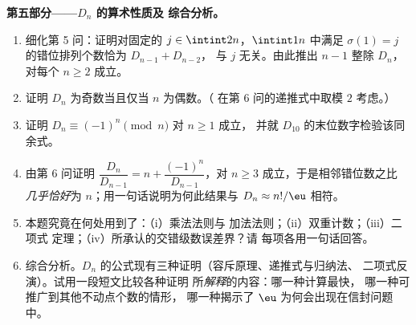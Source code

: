 \begin{problem}
\medskip
\noindent\textbf{第五部分——$D_n$ 的算术性质及
综合分析。}
\begin{enumerate}[resume]
  \item 细化第 5 问：证明对固定的 $j \in
        \intint2n$，$\intint1n$ 中满足
        $\sigma(1) = j$ 的错位排列个数恰为 $D_{n-1} + D_{n-2}$，
        与 $j$ 无关。由此推出 $n - 1$ 整除 $D_n$，
        对每个 $n \geq 2$ 成立。
  \item 证明 $D_n$ 为奇数当且仅当 $n$ 为偶数。（
        在第 6 问的递推式中取模 $2$ 考虑。）
  \item 证明 $D_n \equiv (-1)^n \pmod n$ 对 $n \geq 1$ 成立，
        并就 $D_{10}$ 的末位数字检验该同余式。
  \item 由第 6 问证明 $\dfrac{D_n}{D_{n-1}} = n +
        \dfrac{(-1)^n}{D_{n-1}}$，对 $n \geq 3$ 成立，于是相邻错位数之比
        \emph{几乎恰好}为
        $n$；用一句话说明为何此结果与
        $D_n \approx n!/\eu$ 相符。
  \item 本题究竟在何处用到了：（i）乘法法则与
        加法法则；（ii）双重计数；（iii）二项式
        定理；（iv）所承认的交错级数误差界？请
        每项各用一句话回答。
  \item 综合分析。$D_n$ 的公式现有三种证明（容斥原理、递推式与归纳法、
        二项式反演）。试用一段短文比较各种证明
        所\emph{解释}的内容：哪一种计算最快，
        哪一种可推广到其他不动点个数的情形，
        哪一种揭示了
        $\eu$ 为何会出现在信封问题中。
\end{enumerate}
\end{problem}

